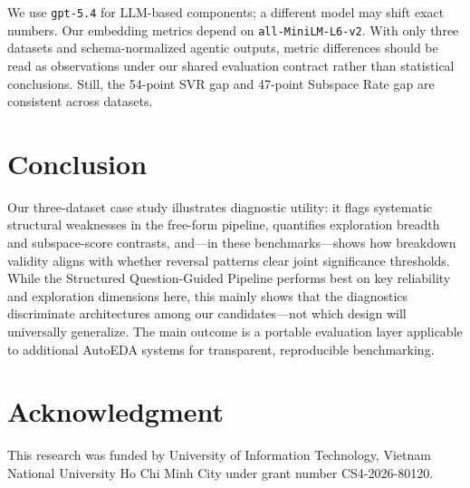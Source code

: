 \documentclass[conference]{IEEEtran}
\begin{document}
We use \texttt{gpt-5.4} for LLM-based components; a different model may shift exact numbers. Our embedding metrics depend on \texttt{all-MiniLM-L6-v2}. With only three datasets and schema-normalized agentic outputs, metric differences should be read as observations under our shared evaluation contract rather than statistical conclusions. Still, the 54-point SVR gap and 47-point Subspace Rate gap are consistent across datasets.

\section{Conclusion}

Our three-dataset case study illustrates diagnostic utility: it flags systematic structural weaknesses in the free-form pipeline, quantifies exploration breadth and subspace-score contrasts, and---in these benchmarks---shows how breakdown validity aligns with whether reversal patterns clear joint significance thresholds. While the Structured Question-Guided Pipeline performs best on key reliability and exploration dimensions here, this mainly shows that the diagnostics discriminate architectures among our candidates---not which design will universally generalize. The main outcome is a portable evaluation layer applicable to additional AutoEDA systems for transparent, reproducible benchmarking.

\section*{Acknowledgment}

This research was funded by University of Information Technology, Vietnam National University Ho Chi Minh City under grant number CS4-2026-80120.
\end{document}
